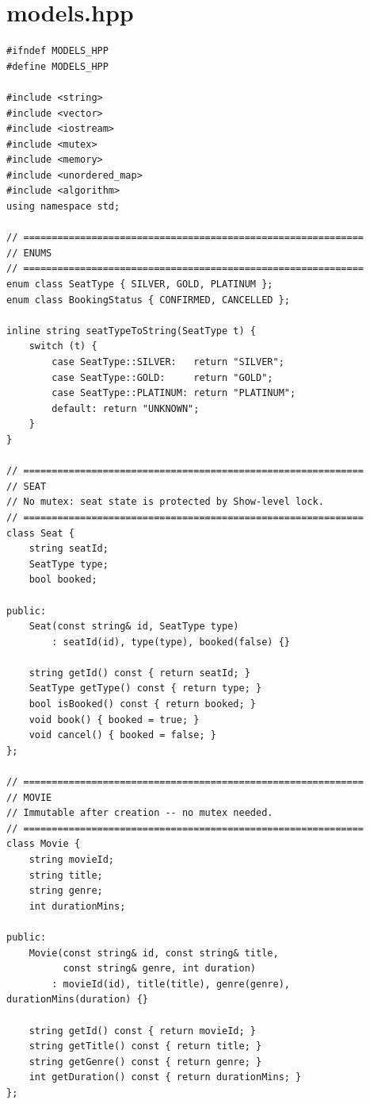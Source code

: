 \documentclass[11pt,a4paper]{article}
\begin{document}
\section{models.hpp}
\begin{lstlisting}[title={\texttt{models.hpp}}]
#ifndef MODELS_HPP
#define MODELS_HPP

#include <string>
#include <vector>
#include <iostream>
#include <mutex>
#include <memory>
#include <unordered_map>
#include <algorithm>
using namespace std;

// ============================================================
// ENUMS
// ============================================================
enum class SeatType { SILVER, GOLD, PLATINUM };
enum class BookingStatus { CONFIRMED, CANCELLED };

inline string seatTypeToString(SeatType t) {
    switch (t) {
        case SeatType::SILVER:   return "SILVER";
        case SeatType::GOLD:     return "GOLD";
        case SeatType::PLATINUM: return "PLATINUM";
        default: return "UNKNOWN";
    }
}

// ============================================================
// SEAT
// No mutex: seat state is protected by Show-level lock.
// ============================================================
class Seat {
    string seatId;
    SeatType type;
    bool booked;

public:
    Seat(const string& id, SeatType type)
        : seatId(id), type(type), booked(false) {}

    string getId() const { return seatId; }
    SeatType getType() const { return type; }
    bool isBooked() const { return booked; }
    void book() { booked = true; }
    void cancel() { booked = false; }
};

// ============================================================
// MOVIE
// Immutable after creation -- no mutex needed.
// ============================================================
class Movie {
    string movieId;
    string title;
    string genre;
    int durationMins;

public:
    Movie(const string& id, const string& title,
          const string& genre, int duration)
        : movieId(id), title(title), genre(genre), durationMins(duration) {}

    string getId() const { return movieId; }
    string getTitle() const { return title; }
    string getGenre() const { return genre; }
    int getDuration() const { return durationMins; }
};


\end{lstlisting}
\end{document}
